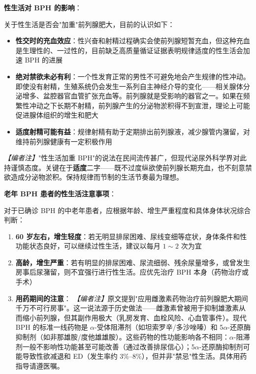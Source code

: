 \vspace{0.5em}
\noindent\textbf{性生活对 BPH 的影响}：

关于性生活是否会"加重"前列腺肥大，目前的认识如下：

\begin{itemize}
	\item \textbf{性交时的充血效应}：性兴奋和射精过程确实会使前列腺短暂充血，但这种充血是生理性的、一过性的，目前缺乏高质量循证证据表明规律适度的性生活会加速 BPH 的进展
	\item \textbf{绝对禁欲未必有利}：一个性发育正常的男性不可避免地会产生规律的性冲动。即使没有射精，生殖系统仍会发生一系列自主神经介导的变化——相关腺体分泌增多、盆腔器官血管扩张充血等。前列腺就是受影响的器官之一。如果在频繁性冲动之下长期不射精，前列腺产生的分泌物淤积得不到宣泄，理论上可能促进腺体组织的增生和肥大
	\item \textbf{适度射精可能有益}：规律射精有助于定期排出前列腺液，减少腺管内潴留，对维持前列腺健康有一定积极作用
\end{itemize}

\noindent\textit{【编者注】}"性生活加重 BPH"的说法在民间流传甚广，但现代泌尿外科学界对此持谨慎态度。关键在于\textbf{适度}二字——既不过度纵欲使前列腺长期充血，也不刻意禁欲造成分泌物淤积。保持规律而节制的生活节奏最为理想。

\vspace{0.5em}
\noindent\textbf{老年 BPH 患者的性生活注意事项}：

对于已确诊 BPH 的中老年患者，应根据年龄、增生严重程度和具体身体状况综合判断：

\begin{enumerate}
	\item \textbf{60 岁左右，增生轻度}：若无明显排尿困难、尿线变细等症状，身体条件和性功能状态良好，可以继续过性生活，建议以每月 $1\sim2$ 次为宜

	\item \textbf{高龄，增生严重}：若有明显的排尿困难、尿流细弱、残余尿量增多，或曾发生房事后尿潴留，则不宜强行进行性生活。应优先治疗 BPH 本身（药物治疗或手术）

	\item \textbf{用药期间的注意}：
	\noindent\textit{【编者注】}原文提到"应用雌激素药物治疗前列腺肥大期间千万不可行房事"。这一说法源于历史做法——雌激素曾被用于抑制雄激素从而缩小前列腺，但其副作用极大（乳房发育、血栓风险、心血管事件）。现代 BPH 的标准一线药物是 $\alpha$-受体阻滞剂（如坦索罗辛/多沙唑嗪）和 5$\alpha$-还原酶抑制剂（如非那雄胺/度他雄雄胺）。这些药物的性功能影响各不相同：$\alpha$-阻滞剂一般不影响性功能甚至可能改善（通过改善排尿信心）；5$\alpha$-还原酶抑制剂可能导致性欲减退和 ED（发生率约 3\%--8\%），但并非"禁忌"性生活。具体用药指导请遵医嘱。
\end{enumerate}

